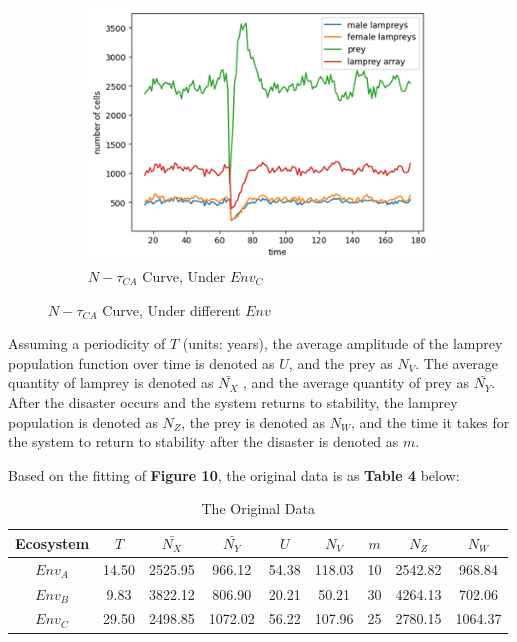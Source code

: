 \documentclass{mcmthesis}
\begin{document}
\begin{figure}[H]
\begin{subfigure}[b]{0.3\textwidth}
    \includegraphics[width=\textwidth]{figures/6_3_figur3.png}
    \caption{$N-\tau_{CA}$ Curve, Under $Env_{C}$}
    \label{fig:sub2}
  \end{subfigure}
  \caption{$N-\tau_{CA}$ Curve, Under different $Env$}
  \label{fig:Simulation of Disaster}
\end{figure}

Assuming a periodicity of $T$ (units: years), the average amplitude of the lamprey population function over time is denoted as $U$, and the prey as $N_V$. The average quantity of lamprey is denoted as $\bar{ N_X}$ , and the average quantity of prey as $\bar{ N_Y}$. After the disaster occurs and the system returns to stability, the lamprey population is denoted as $N_Z$, the prey is denoted as $N_W$, and the time it takes for the system to return to stability after the disaster is denoted as $m$.

Based on the fitting of \textbf{Figure 10}, the original data is as \textbf{Table 4} below:

\begin{table}[!ht]
    \centering
    \begin{tabular}{ccccccccc}
    \hline
        \textbf{Ecosystem} & \textbf{$T$} & \textbf{ $\bar{ N_X}$} & \textbf{$\bar{ N_Y}$} & \textbf{$U$} & \textbf{$N_V$} & \textbf{$m$} & \textbf{$N_Z$} & \textbf{$N_W$} \\ \hline
        \textbf{$Env_{A}$} & 14.50 & 2525.95 & 966.12 & 54.38 & 118.03 & 10 & 2542.82 & 968.84  \\ 
        \textbf{$Env_{B}$} & 9.83 & 3822.12 & 806.90 & 20.21 & 50.21 & 30 & 4264.13 & 702.06  \\ 
        \textbf{$Env_{C}$} & 29.50 & 2498.85 & 1072.02 & 56.22 & 107.96 & 25 & 2780.15 & 1064.37  \\ \hline
    \end{tabular}
    \caption{The Original Data}
    \label{The Original Data}
\end{table}
\end{document}

